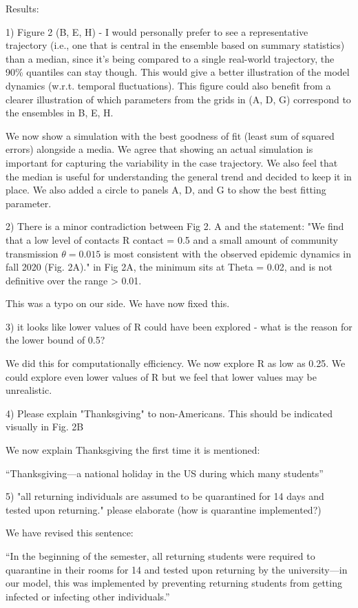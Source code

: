\documentclass[12pt]{article}
\newcommand{\revtext}{\textsf}
\begin{document}
\revtext{Results:}

\revtext{1) Figure 2 (B, E, H) - I would personally prefer to see a representative trajectory (i.e., one that is central in the ensemble based on summary statistics) than a median, since it's being compared to a single real-world trajectory, the 90\% quantiles can stay though. This would give a better illustration of the model dynamics (w.r.t. temporal fluctuations). 
This figure could also benefit from a clearer illustration of which parameters from the grids in (A, D, G) correspond to the ensembles in B, E, H.}

We now show a simulation with the best goodness of fit (least sum of squared errors) alongside a media. 
We agree that showing an actual simulation is important for capturing the variability in the case trajectory.
We also feel that the median is useful for understanding the general trend and decided to keep it in place.
We also added a circle to panels A, D, and G to show the best fitting parameter.

\revtext{2) There is a minor contradiction between Fig 2. A and the statement: "We find that a low level of contacts R contact = 0.5 and a small amount of community transmission $\theta = 0.015$ is most consistent with the observed epidemic dynamics in fall 2020 (Fig. 2A)." in Fig 2A, the minimum sits at Theta = 0.02, and is not definitive over the range > 0.01.}

This was a typo on our side. We have now fixed this.

\revtext{3) it looks like lower values of R could have been explored - what is the reason for the lower bound of 0.5?}

We did this for computationally efficiency. We now explore R as low as 0.25.
We could explore even lower values of R but we feel that lower values may be unrealistic.

\revtext{4) Please explain "Thanksgiving" to non-Americans. This should be indicated visually in Fig. 2B}

We now explain Thanksgiving the first time it is mentioned:

``Thanksgiving---a national holiday in the US during which many students''

\revtext{5) "all returning individuals are assumed to be quarantined for 14 days and tested upon returning." please elaborate (how is quarantine implemented?)}

We have revised this sentence:

``In the beginning of the semester, all returning students were required to quarantine in their rooms for 14 and tested upon returning by the university---in our model, this was implemented by preventing returning students from getting infected or infecting other individuals.''
\end{document}
